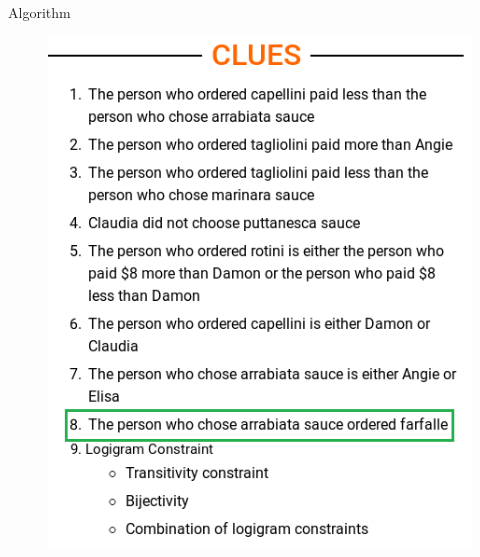 \documentclass{beamer}
\begin{document}
\begin{frame}{Algorithm}
{\begin{minipage}[t]{0.40\textwidth}
\begin{figure}[h]
                \includegraphics[width=\textwidth]{figures/clues}
                \label{clues}
            \end{figure}

        \end{minipage}

}
\end{frame}
\end{document}
